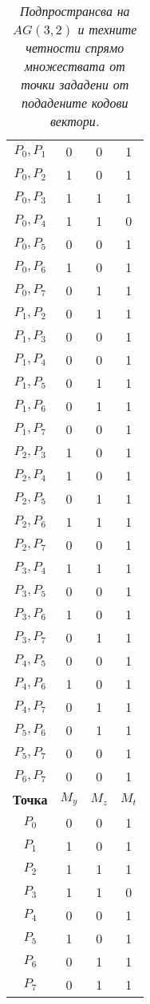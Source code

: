 \documentclass[11pt, oneside]{article}   	%
\begin{document}
\begin{table}
\begin{minipage}[t]{.3\textwidth}
\begin{tabular}{cccc}
\midrule
$ P_{0}, P_{1} $ & 0 & 0 & 1 \\
$ P_{0}, P_{2} $ & 1 & 0 & 1 \\
$ P_{0}, P_{3} $ & 1 & 1 & 1 \\
$ P_{0}, P_{4} $ & 1 & 1 & 0 \\
$ P_{0}, P_{5} $ & 0 & 0 & 1 \\
$ P_{0}, P_{6} $ & 1 & 0 & 1 \\
$ P_{0}, P_{7} $ & 0 & 1 & 1 \\
$ P_{1}, P_{2} $ & 0 & 1 & 1 \\
$ P_{1}, P_{3} $ & 0 & 0 & 1 \\
$ P_{1}, P_{4} $ & 0 & 0 & 1 \\
$ P_{1}, P_{5} $ & 0 & 1 & 1 \\
$ P_{1}, P_{6} $ & 0 & 1 & 1 \\
$ P_{1}, P_{7} $ & 0 & 0 & 1 \\
$ P_{2}, P_{3} $ & 1 & 0 & 1 \\
$ P_{2}, P_{4} $ & 1 & 0 & 1 \\
$ P_{2}, P_{5} $ & 0 & 1 & 1 \\
$ P_{2}, P_{6} $ & 1 & 1 & 1 \\
$ P_{2}, P_{7} $ & 0 & 0 & 1 \\
$ P_{3}, P_{4} $ & 1 & 1 & 1 \\
$ P_{3}, P_{5} $ & 0 & 0 & 1 \\
$ P_{3}, P_{6} $ & 1 & 0 & 1 \\
$ P_{3}, P_{7} $ & 0 & 1 & 1 \\
$ P_{4}, P_{5} $ & 0 & 0 & 1 \\
$ P_{4}, P_{6} $ & 1 & 0 & 1 \\
$ P_{4}, P_{7} $ & 0 & 1 & 1 \\
$ P_{5}, P_{6} $ & 0 & 1 & 1 \\
$ P_{5}, P_{7} $ & 0 & 0 & 1 \\
$ P_{6}, P_{7} $ & 0 & 0 & 1 \\
\bottomrule
\toprule
\textbf{Точка} & \textbf{$M_{y}$} & \textbf{$M_{z}$} & \textbf{$M_{t}$}\\
\midrule
$ P_{0} $ & 0 & 0 & 1 \\
$ P_{1} $ & 1 & 0 & 1 \\
$ P_{2} $ & 1 & 1 & 1 \\
$ P_{3} $ & 1 & 1 & 0 \\
$ P_{4} $ & 0 & 0 & 1 \\
$ P_{5} $ & 1 & 0 & 1 \\
$ P_{6} $ & 0 & 1 & 1 \\
$ P_{7} $ & 0 & 1 & 1 \\
\bottomrule
\end{tabular}
\end{minipage} \hfill
\caption{\textit{Подпространсва на $AG(3, 2)$ и техните четности спрямо множествата от точки зададени от подадените кодови вектори.}}
\end{table}
\end{document}
